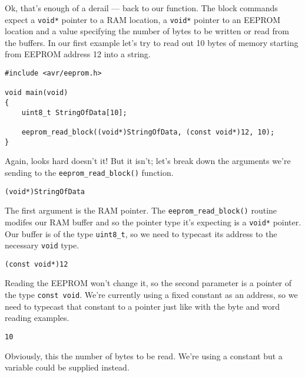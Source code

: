 \documentclass[a4paper,oneside,notitlepage]{book}
\begin{document}
Ok, that's enough of a derail --- back to our function. The block commands expect a \lstinline{void*} pointer to a RAM location, a \lstinline{void*} pointer to an EEPROM location and a value specifying the number of bytes to be written or read from the buffers. In our first example let's try to read out 10 bytes of memory starting from EEPROM address 12 into a string.

\begin{center}
\begin{lstlisting}
#include <avr/eeprom.h>

void main(void)
{
    uint8_t StringOfData[10];

    eeprom_read_block((void*)StringOfData, (const void*)12, 10);
}
\end{lstlisting}
\end{center}

Again, looks hard doesn't it! But it isn't; let's break down the arguments we're sending to the \lstinline{eeprom_read_block()} function.

\begin{center}
\begin{lstlisting}
(void*)StringOfData
\end{lstlisting}
\end{center}

The first argument is the RAM pointer. The \lstinline{eeprom_read_block()} routine modifes our RAM buffer and so the pointer type it's expecting is a \lstinline{void*} pointer. Our buffer is of the type \lstinline{uint8_t}, so we need to typecast its address to the necessary \lstinline{void} type.

\begin{center}
\begin{lstlisting}
(const void*)12
\end{lstlisting}
\end{center}

Reading the EEPROM won't change it, so the second parameter is a pointer of the type \lstinline{const void}. We're currently using a fixed constant as an address, so we need to typecast that constant to a pointer just like with the byte and word reading examples.

\begin{center}
\begin{lstlisting}
10
\end{lstlisting}
\end{center}

Obviously, this the number of bytes to be read. We're using a constant but a variable could be supplied instead.
\end{document}
